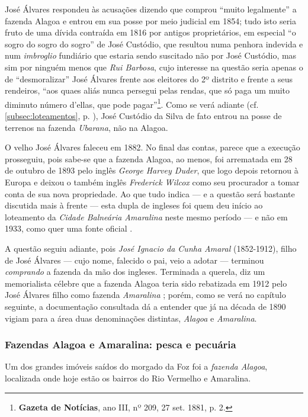 José Álvares respondeu às acusações dizendo que comprou ``muito legalmente'' a fazenda Alagoa e entrou em sua posse por meio judicial em 1854; tudo isto seria fruto de uma dívida contraída em 1816 por antigos proprietários, em especial ``o sogro do sogro do sogro'' de José Custódio, que resultou numa penhora indevida e num \textit{imbroglio} fundiário que estaria sendo suscitado não por José Custódio, mas sim por ninguém menos que \textit{Rui Barbosa}, cujo interesse na questão seria apenas o de ``desmoralizar'' José Álvares frente aos eleitores do 2º distrito e frente a seus rendeiros, ``aos quaes aliás nunca persegui pelas rendas, que só paga um muito diminuto número d'ellas, que pode pagar''\footnote{\textbf{Gazeta de Notícias}, ano III, nº 209, 27 set. 1881, p. 2.}. Como se verá adiante (cf. \autoref{subsec:loteamentos}, p. \pageref{subsec:loteamentos}), José Custódio da Silva de fato entrou na posse de terrenos na fazenda \textit{Ubarana}, não na Alagoa. 

O velho José Álvares faleceu em 1882. No final das contas, parece que a execução prosseguiu, pois sabe-se que a fazenda Alagoa, ao menos, foi arrematada em 28 de outubro de 1893 pelo inglês \textit{George Harvey Duder}, que logo depois retornou à Europa e deixou o também inglês \textit{Frederick Wilcox} como seu procurador a tomar conta de sua nova propriedade. Ao que tudo indica --- e a questão será bastante discutida mais à frente --- esta dupla de ingleses foi quem deu início ao loteamento da \textit{Cidade Balneária Amaralina} neste mesmo período --- e não em 1933, como quer uma fonte oficial \cite{salvador_loteamentos_1977}.

A questão seguiu adiante, pois \textit{José Ignacio da Cunha Amaral} (1852-1912), filho de José Álvares --- cujo nome, falecido o pai, veio a adotar --- terminou \textit{comprando} a fazenda da mão dos ingleses. Terminada a querela, diz um memorialista célebre que a fazenda Alagoa teria sido rebatizada em 1912 pelo José Álvares filho como fazenda \textit{Amaralina} \cite[p.~118]{campos_alagoa_1942}; porém, como se verá no capítulo seguinte, a documentação consultada dá a entender que já na década de 1890 vigiam para a área duas denominações distintas, \textit{Alagoa} e \textit{Amaralina}.

\subsubsection{Fazendas Alagoa e Amaralina: pesca e pecuária}

Um dos grandes imóveis saídos do morgado da Foz foi a \textit{fazenda Alagoa}, localizada onde hoje estão os bairros do Rio Vermelho e Amaralina.

